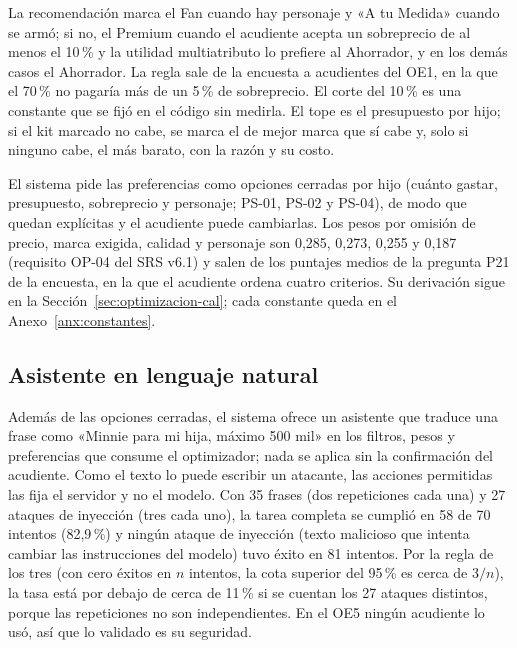 La recomendación marca el Fan cuando hay personaje y «A tu Medida» cuando se armó; si no, el
Premium cuando el acudiente acepta un sobreprecio de al menos el 10\,\% y la utilidad multiatributo lo
prefiere al Ahorrador, y en los demás casos el Ahorrador. La regla sale de la encuesta a acudientes del OE1,
en la que el 70\,\% no pagaría más de un 5\,\% de sobreprecio. El corte del 10\,\% es una constante que
se fijó en el código sin medirla. El tope es el presupuesto por hijo; si el kit marcado no cabe, se marca el
de mejor marca que sí cabe y, solo si ninguno cabe, el más barato, con la razón y su costo.

El sistema pide las preferencias como opciones cerradas por hijo (cuánto gastar, presupuesto,
sobreprecio y personaje; PS-01, PS-02 y PS-04), de modo que quedan explícitas y el acudiente puede cambiarlas.
Los pesos por omisión de precio, marca exigida, calidad y personaje son 0,285, 0,273, 0,255 y 0,187
(requisito OP-04 del SRS v6.1) y salen de los puntajes medios de la pregunta P21 de la encuesta, en la que el acudiente ordena cuatro criterios. Su derivación sigue en la Sección~\ref{sec:optimizacion-cal}; cada constante queda en el Anexo~\ref{anx:constantes}.\label{sec:constantes}



\subsection{Asistente en lenguaje natural}
\label{sec:nl2c-resumen}

Además de las opciones cerradas, el sistema ofrece un asistente que traduce una frase como «Minnie para
mi hija, máximo 500 mil» en los filtros, pesos y preferencias que consume el optimizador; nada se
aplica sin la confirmación del acudiente. Como el
texto lo puede escribir un atacante, las acciones permitidas las fija el servidor y no el modelo. Con 35
frases (dos repeticiones cada una) y 27 ataques de inyección (tres cada uno), la tarea completa se
cumplió en 58 de 70 intentos (82,9\,\%) y ningún ataque de inyección (texto malicioso que intenta cambiar las instrucciones del modelo) tuvo
éxito en 81 intentos. Por la regla de los tres (con cero éxitos en $n$ intentos, la cota superior del
95\,\% es cerca de $3/n$), la tasa está por debajo de cerca de 11\,\% si se cuentan los 27 ataques distintos, porque las repeticiones no son independientes. En el OE5 ningún acudiente lo usó, así que lo validado es su seguridad.

